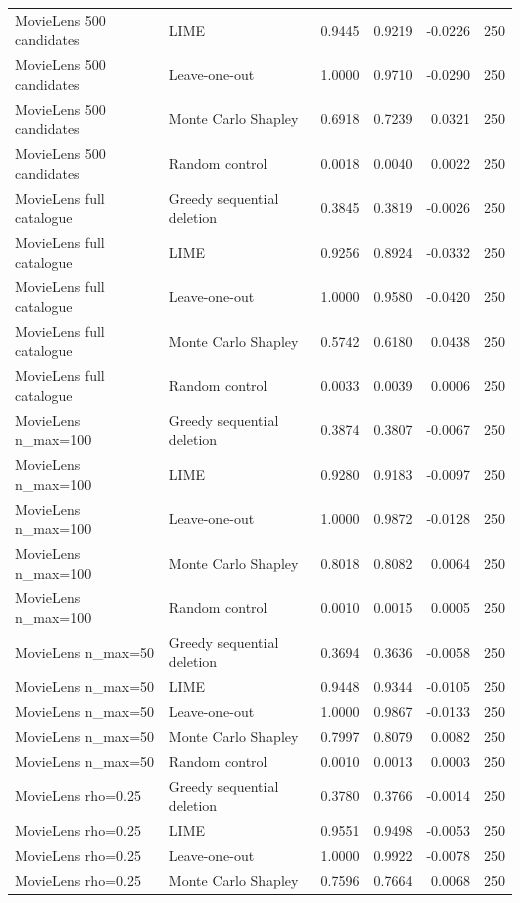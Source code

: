 \begin{longtable}{@{}p{}p{}rrrr@{}}
MovieLens 500 candidates & LIME & 0.9445 & 0.9219 & -0.0226 & 250 \\
MovieLens 500 candidates & Leave-one-out & 1.0000 & 0.9710 & -0.0290 & 250 \\
MovieLens 500 candidates & Monte Carlo Shapley & 0.6918 & 0.7239 & 0.0321 & 250 \\
MovieLens 500 candidates & Random control & 0.0018 & 0.0040 & 0.0022 & 250 \\
MovieLens full catalogue & Greedy sequential deletion & 0.3845 & 0.3819 & -0.0026 & 250 \\
MovieLens full catalogue & LIME & 0.9256 & 0.8924 & -0.0332 & 250 \\
MovieLens full catalogue & Leave-one-out & 1.0000 & 0.9580 & -0.0420 & 250 \\
MovieLens full catalogue & Monte Carlo Shapley & 0.5742 & 0.6180 & 0.0438 & 250 \\
MovieLens full catalogue & Random control & 0.0033 & 0.0039 & 0.0006 & 250 \\
MovieLens n\_max=100 & Greedy sequential deletion & 0.3874 & 0.3807 & -0.0067 & 250 \\
MovieLens n\_max=100 & LIME & 0.9280 & 0.9183 & -0.0097 & 250 \\
MovieLens n\_max=100 & Leave-one-out & 1.0000 & 0.9872 & -0.0128 & 250 \\
MovieLens n\_max=100 & Monte Carlo Shapley & 0.8018 & 0.8082 & 0.0064 & 250 \\
MovieLens n\_max=100 & Random control & 0.0010 & 0.0015 & 0.0005 & 250 \\
MovieLens n\_max=50 & Greedy sequential deletion & 0.3694 & 0.3636 & -0.0058 & 250 \\
MovieLens n\_max=50 & LIME & 0.9448 & 0.9344 & -0.0105 & 250 \\
MovieLens n\_max=50 & Leave-one-out & 1.0000 & 0.9867 & -0.0133 & 250 \\
MovieLens n\_max=50 & Monte Carlo Shapley & 0.7997 & 0.8079 & 0.0082 & 250 \\
MovieLens n\_max=50 & Random control & 0.0010 & 0.0013 & 0.0003 & 250 \\
MovieLens rho=0.25 & Greedy sequential deletion & 0.3780 & 0.3766 & -0.0014 & 250 \\
MovieLens rho=0.25 & LIME & 0.9551 & 0.9498 & -0.0053 & 250 \\
MovieLens rho=0.25 & Leave-one-out & 1.0000 & 0.9922 & -0.0078 & 250 \\
MovieLens rho=0.25 & Monte Carlo Shapley & 0.7596 & 0.7664 & 0.0068 & 250 \\

\end{longtable}
